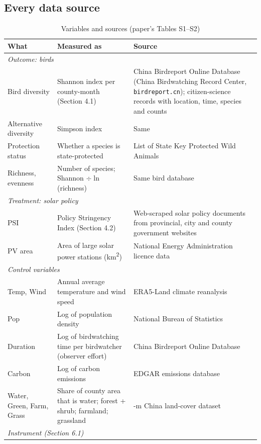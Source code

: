 \documentclass[11pt]{article}
\begin{document}
\subsection{Every data source}
\begin{table}[H]\centering\footnotesize\renewcommand{\arraystretch}{0.95}
\caption{Variables and sources (paper's Tables S1--S2)}
\begin{tabularx}{\linewidth}{l>{\raggedright\arraybackslash}X>{\raggedright\arraybackslash}X}
\toprule
\textbf{What} & \textbf{Measured as} & \textbf{Source}\\
\midrule
\multicolumn{3}{l}{\emph{Outcome: birds}}\\
Bird diversity & Shannon index per county-month (Section 4.1) & China Birdreport Online Database (China Birdwatching Record Center, \texttt{birdreport.cn}); citizen-science records with location, time, species and counts\\
Alternative diversity & Simpson index & Same\\
Protection status & Whether a species is state-protected & 2021 List of State Key Protected Wild Animals\\
Richness, evenness & Number of species; Shannon $\div\ln$(richness) & Same bird database\\
\midrule
\multicolumn{3}{l}{\emph{Treatment: solar policy}}\\
PSI & Policy Stringency Index (Section 4.2) & Web-scraped solar policy documents from provincial, city and county government websites\\
PV area & Area of large solar power stations (km\textsuperscript{2}) & National Energy Administration licence data\\
\midrule
\multicolumn{3}{l}{\emph{Control variables}}\\
Temp, Wind & Annual average temperature and wind speed & ERA5-Land climate reanalysis\\
Pop & Log of population density & National Bureau of Statistics\\
Duration & Log of birdwatching time per birdwatcher (observer effort) & China Birdreport Online Database\\
Carbon & Log of carbon emissions & EDGAR emissions database\\
Water, Green, Farm, Grass & Share of county area that is water; forest + shrub; farmland; grassland & 30-m China land-cover dataset\\
\midrule
\multicolumn{3}{l}{\emph{Instrument (Section 6.1)}}\\

\end{tabularx}
\end{table}
\end{document}
